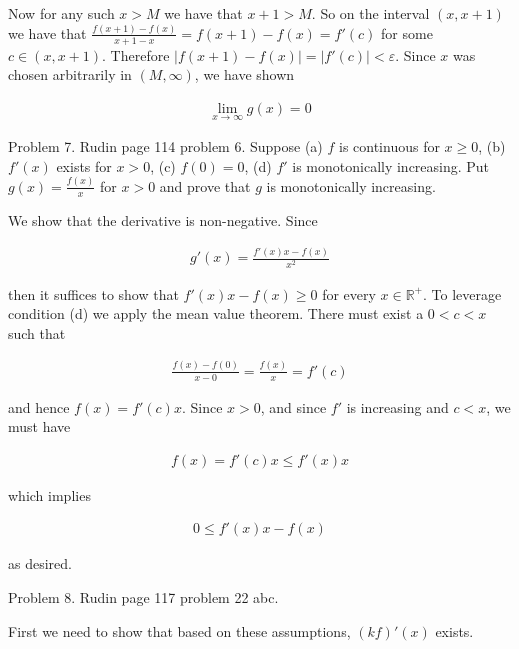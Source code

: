 \documentclass{article}
\begin{document}
  Now for any such $x>M$ we have that $x+1>M$.  So on the interval $(x,x+1)$ we have that $\frac{f(x+1)-f(x)}{x+1-x} = f(x+1)-f(x) = f'(c)$ for some $c\in (x,x+1)$.  Therefore $|f(x+1)-f(x)| = |f'(c)|<\varepsilon$.  Since $x$ was chosen arbitrarily in $(M,\infty)$, we have shown

  \begin{align*}
    \lim_{x\to \infty}g(x)=0
  \end{align*}

  \pagebreak

  {\Large \color{Sepia} Problem 7. Rudin page 114 problem 6. Suppose (a) $f$ is continuous for $x\geq 0$, (b) $f'(x)$ exists for $x>0$, (c) $f(0)=0$, (d) $f'$ is monotonically increasing.  Put $g(x)=\frac{f(x)}{x}$ for $x>0$ and prove that $g$ is monotonically increasing.}

  \vspace{1cm}

  We show that the derivative is non-negative.  Since

  \begin{align*}
    g'(x) = \frac{f'(x)x-f(x)}{x^2}
  \end{align*}

  then it suffices to show that $f'(x)x-f(x)\geq 0$ for every $x\in\mathbb R^+$.  To leverage condition (d) we apply the mean value theorem.  There must exist a $0 < c < x$ such that

  \begin{align*}
    \frac{f(x)-f(0)}{x-0} = \frac{f(x)}{x} = f'(c)
  \end{align*}

  and hence $f(x) = f'(c)x$.  Since $x > 0$, and since $f'$ is increasing and $c<x$, we must have

  \begin{align*}
    f(x) = f'(c)x \leq f'(x)x
  \end{align*}

  which implies

  \begin{align*}
    0\leq f'(x)x-f(x)
  \end{align*}

  as desired.

  \pagebreak

  {\Large \color{Sepia} Problem 8. Rudin page 117 problem 22 abc. }

  \vspace{1cm}

  First we need to show that based on these assumptions, $(kf)'(x)$ exists.
\end{document}
